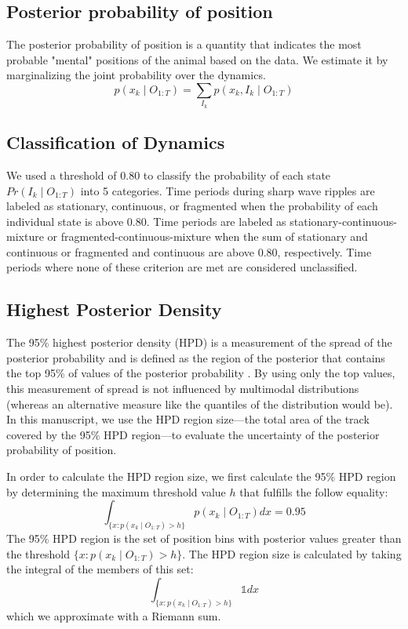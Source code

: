 \documentclass[9pt,lineno]{elife}
\begin{document}
\subsection*{Posterior probability of position}
The posterior probability of position is a quantity that indicates the most probable "mental" positions of the animal based on the data. We estimate it by marginalizing the joint probability over the dynamics.
$$p(x_{k} \mid O_{1:T}) = \sum_{I_{k}} p(x_{k}, I_{k} \mid O_{1:T})$$

\subsection*{Classification of Dynamics}
We used a threshold of 0.80 to classify the probability of each state $Pr(I_{k} \mid O_{1:T})$ into 5 categories. Time periods during sharp wave ripples are labeled as stationary, continuous, or fragmented when the probability of each individual state is above 0.80. Time periods are labeled as stationary-continuous-mixture or fragmented-continuous-mixture when the sum of stationary and continuous or fragmented and continuous are above 0.80, respectively. Time periods where none of these criterion are met are considered unclassified.

\subsection*{Highest Posterior Density}
The 95\% highest posterior density (HPD) is a measurement of the spread of the posterior probability and is defined as the region of the posterior that contains the top 95\% of values of the posterior probability \citep{CasellaStatisticalinference2001}. By using only the top values, this measurement of spread is not influenced by multimodal distributions (whereas an alternative measure like the quantiles of the distribution would be). In this manuscript, we use the HPD region size---the total area of the track covered by the 95\% HPD region---to evaluate the uncertainty of the posterior probability of position. 

In order to calculate the HPD region size, we first calculate the 95\% HPD region by determining the maximum threshold value $h$ that fulfills the follow equality:
$$
\int_{\{x: p(x_{k} \mid O_{1:T}) > h\}} p(x_{k} \mid O_{1:T})dx = 0.95
$$
The 95\% HPD region is the set of position bins with posterior values greater than the threshold $\{x : p(x_{k} \mid O_{1:T}) > h\}$. The HPD region size is calculated by taking the integral of the members of this set:
$$
\int_{\{x: p(x_{k} \mid O_{1:T}) > h\}} \mathbb{1}dx
$$
which we approximate with a Riemann sum.
\end{document}
